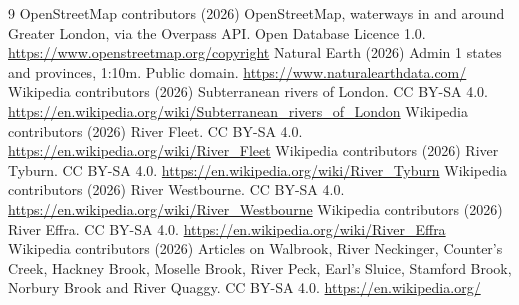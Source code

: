\documentclass[11pt,a4paper]{article}
\begin{document}
\begin{thebibliography}{9}
 OpenStreetMap contributors (2026) OpenStreetMap, waterways in and around Greater London, via the Overpass API. Open Database Licence 1.0. \url{https://www.openstreetmap.org/copyright}
 Natural Earth (2026) Admin 1 states and provinces, 1:10m. Public domain. \url{https://www.naturalearthdata.com/}
 Wikipedia contributors (2026) Subterranean rivers of London. CC BY-SA 4.0. \url{https://en.wikipedia.org/wiki/Subterranean_rivers_of_London}
 Wikipedia contributors (2026) River Fleet. CC BY-SA 4.0. \url{https://en.wikipedia.org/wiki/River_Fleet}
 Wikipedia contributors (2026) River Tyburn. CC BY-SA 4.0. \url{https://en.wikipedia.org/wiki/River_Tyburn}
 Wikipedia contributors (2026) River Westbourne. CC BY-SA 4.0. \url{https://en.wikipedia.org/wiki/River_Westbourne}
 Wikipedia contributors (2026) River Effra. CC BY-SA 4.0. \url{https://en.wikipedia.org/wiki/River_Effra}
 Wikipedia contributors (2026) Articles on Walbrook, River Neckinger, Counter's Creek, Hackney Brook, Moselle Brook, River Peck, Earl's Sluice, Stamford Brook, Norbury Brook and River Quaggy. CC BY-SA 4.0. \url{https://en.wikipedia.org/}
\end{thebibliography}
\end{document}
